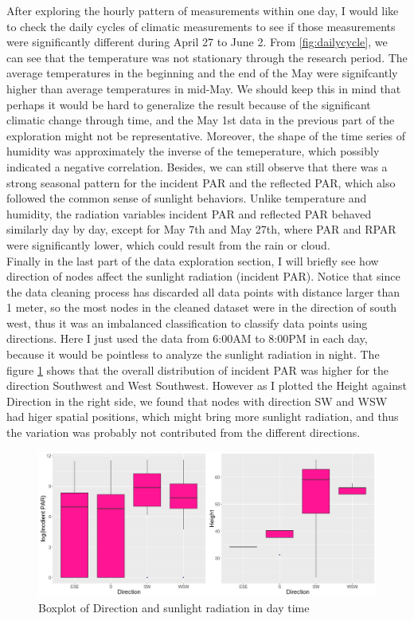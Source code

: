 \documentclass[11pt]{article}
\begin{document}
{After exploring the hourly pattern of measurements within one day, I would like to check the daily cycles of climatic measurements to see if those measurements were significantly different during April 27 to June 2. From \ref{fig:dailycycle}, we can see that the temperature was not stationary through the research period. The average temperatures in the beginning and the end of the May were signifcantly higher than average temperatures in mid-May. We should keep this in mind that perhaps it would be hard to generalize the result because of the significant climatic change through time, and the May 1st data in the previous part of the exploration might not be representative. Moreover, the shape of the time series of humidity was approximately the inverse of the temeperature, which possibly indicated a negative correlation. Besides, we can still observe that there was a strong seasonal pattern for the incident PAR and the reflected PAR, which also followed the common sense of sunlight behaviors. Unlike temperature and humidity, the radiation variables incident PAR and reflected PAR behaved similarly day by day, except for May 7th and May 27th, where PAR and RPAR were significantly lower, which could result from the rain or cloud.\\
Finally in the last part of the data exploration section, I will briefly see how direction of nodes affect the sunlight radiation (incident PAR). Notice that since the data cleaning process has discarded all data points with distance larger than 1 meter, so the most nodes in the cleaned dataset were in the direction of south west, thus it was an imbalanced classification to classify data points using directions. Here I just used the data from 6:00AM to 8:00PM in each day, because it would be pointless to analyze the sunlight radiation in night. The figure \ref{fig:boxpar} shows that the overall distribution of incident PAR was higher for the direction Southwest and West Southwest. However as I plotted the Height against Direction in the right side, we found that nodes with direction SW and WSW had higer spatial positions, which might bring more sunlight radiation, and thus the variation was probably not contributed from the different directions.
\begin{figure}[H]
\centering
\includegraphics [width=0.95\linewidth,height=0.3\linewidth]{box_par.png}
\caption{Boxplot of Direction and sunlight radiation in day time}
\label{fig:boxpar}
\end{figure}
}
\end{document}
